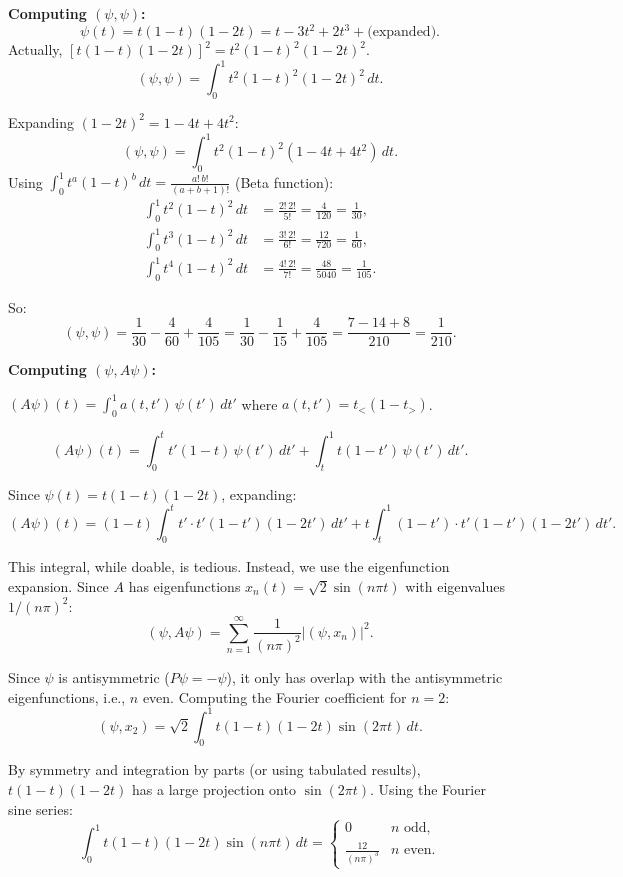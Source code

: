\documentclass[12pt]{article}
\begin{document}
\textbf{Computing $(\psi, \psi)$:}
\[
\psi(t) = t(1-t)(1-2t) = t - 3t^2 + 2t^3 + \text{(expanded)}.
\]
Actually, $[t(1-t)(1-2t)]^2 = t^2(1-t)^2(1-2t)^2$.
\[
(\psi, \psi) = \int_0^1 t^2(1-t)^2(1-2t)^2\,dt.
\]

Expanding $(1-2t)^2 = 1 - 4t + 4t^2$:
\[
(\psi, \psi) = \int_0^1 t^2(1-t)^2(1 - 4t + 4t^2)\,dt.
\]
Using $\int_0^1 t^a(1-t)^b\,dt = \frac{a!\,b!}{(a+b+1)!}$ (Beta function):
\begin{align}
\int_0^1 t^2(1-t)^2\,dt &= \frac{2!\,2!}{5!} = \frac{4}{120} = \frac{1}{30}, \\
\int_0^1 t^3(1-t)^2\,dt &= \frac{3!\,2!}{6!} = \frac{12}{720} = \frac{1}{60}, \\
\int_0^1 t^4(1-t)^2\,dt &= \frac{4!\,2!}{7!} = \frac{48}{5040} = \frac{1}{105}.
\end{align}

So:
\[
(\psi, \psi) = \frac{1}{30} - \frac{4}{60} + \frac{4}{105} = \frac{1}{30} - \frac{1}{15} + \frac{4}{105} = \frac{7 - 14 + 8}{210} = \frac{1}{210}.
\]

\textbf{Computing $(\psi, A\psi)$:}

$(A\psi)(t) = \int_0^1 a(t,t')\,\psi(t')\,dt'$ where $a(t,t') = t_<(1-t_>)$.

\[
(A\psi)(t) = \int_0^t t'(1-t)\,\psi(t')\,dt' + \int_t^1 t(1-t')\,\psi(t')\,dt'.
\]

Since $\psi(t) = t(1-t)(1-2t)$, expanding:
\[
(A\psi)(t) = (1-t)\int_0^t t'\cdot t'(1-t')(1-2t')\,dt' + t\int_t^1 (1-t')\cdot t'(1-t')(1-2t')\,dt'.
\]

This integral, while doable, is tedious. Instead, we use the eigenfunction expansion. Since $A$ has eigenfunctions $x_n(t) = \sqrt{2}\sin(n\pi t)$ with eigenvalues $1/(n\pi)^2$:
\[
(\psi, A\psi) = \sum_{n=1}^{\infty} \frac{1}{(n\pi)^2} |(\psi, x_n)|^2.
\]

Since $\psi$ is antisymmetric ($P\psi = -\psi$), it only has overlap with the antisymmetric eigenfunctions, i.e., $n$ even. Computing the Fourier coefficient for $n = 2$:
\[
(\psi, x_2) = \sqrt{2}\int_0^1 t(1-t)(1-2t)\sin(2\pi t)\,dt.
\]

By symmetry and integration by parts (or using tabulated results), $t(1-t)(1-2t)$ has a large projection onto $\sin(2\pi t)$. Using the Fourier sine series:
\[
\int_0^1 t(1-t)(1-2t)\sin(n\pi t)\,dt = \begin{cases} 0 & n \text{ odd}, \\ \frac{12}{(n\pi)^3} & n \text{ even}.\end{cases}
\]
\end{document}
